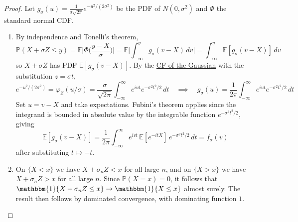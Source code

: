 	\begin{proof}
		Let $g_\sigma (u) = \frac{1}{\sigma \sqrt{2 \pi}} e^{-u^2 / (2 \sigma^2)}$ be the PDF of $N(0, \sigma^2)$ and $\Phi$ the standard normal CDF. 
		\begin{enumerate}
			\item By independence and Tonelli's theorem, 
			\begin{equation}
				\mathbb{P}(X + \sigma Z \leq y) = \mathbb{E}\bigg[ \Phi \Big( \frac{y - X}{\sigma} \Big) \bigg] = \mathbb{E} \bigg[ \int_{-\infty}^y g_\sigma (v - X) \,dv \bigg] = \int_{-\infty}^y \mathbb{E}[g_\sigma (v - X)] \,dv
			\end{equation}
			so $X + \sigma Z$ has PDF $\mathbb{E}[g_\sigma (v - X)]$. By the \hyperref[thm:cf-of-gaussian-distribution]{CF of the Gaussian} with the substitution $z = \sigma t$, 
			\begin{equation}
				e^{-u^2 / (2 \sigma^2)} = \varphi_Z (u / \sigma) = \frac{\sigma}{\sqrt{2\pi}} \int_{-\infty}^\infty e^{i u t} e^{-\sigma^2 t^2 / 2} \,dt
				\quad \implies \quad 
				g_\sigma (u) = \frac{1}{2 \pi} \int_{-\infty}^\infty e^{i u t} e^{-\sigma^2 t^2 / 2} \,dt
			\end{equation}
			Set $u = v - X$ and take expectations. Fubini's theorem applies since the integrand is bounded in absolute value by the integrable function $e^{-\sigma^2 t^2 / 2}$, giving 
			\begin{equation}
				\mathbb{E}[g_\sigma (v - X)] = \frac{1}{2 \pi} \int_{-\infty}^\infty e^{i v t} \, \mathbb{E}[e^{-i t X}] \, e^{-\sigma^2 t^2 / 2} \,dt = f_\sigma (v)
			\end{equation}
			after substituting $t \mapsto -t$. 
			
			\item On $\{X < x\}$ we have $X + \sigma_n Z < x$ for all large $n$, and on $\{X > x\}$ we have $X + \sigma_n Z > x$ for all large $n$. Since $\mathbb{P}(X = x) = 0$, it follows that $\mathbbm{1}\{X + \sigma_n Z \leq x\} \to \mathbbm{1}\{X \leq x\}$ almost surely. The result then follows by dominated convergence, with dominating function $1$. 
		\end{enumerate}
	\end{proof}

